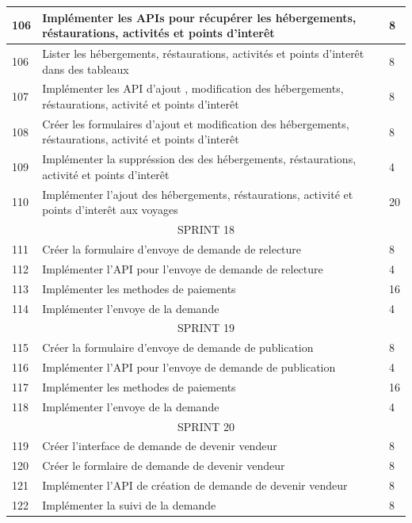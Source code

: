 \documentclass[12pt]{report}
\begin{document}
\begin{longtable}{|p{1cm}|p{7cm}|p{6cm}|}
						\hline
						106 & Implémenter les APIs pour récupérer les hébergements, réstaurations, activités et points d'interêt & 8\\
						\hline
						106 & Lister les hébergements, réstaurations, activités et points d'interêt dans des tableaux & 8\\
						\hline
						107 & Implémenter les API d'ajout , modification des hébergements, réstaurations, activité et points d'interêt & 8\\
						\hline
						108 & Créer les formulaires d'ajout et modification des hébergements, réstaurations, activité et points d'interêt & 8\\
						\hline
						109 & Implémenter la suppréssion des des hébergements, réstaurations, activité et points d'interêt & 4\\
						\hline
						110 & Implémenter l'ajout des hébergements, réstaurations, activité et points d'interêt aux voyages & 20\\
						\hline
						\multicolumn{3}{|c|}{SPRINT 18}\\
						\hline
						111 & Créer la formulaire d'envoye de demande de relecture & 8\\
						112 & Implémenter l'API pour l'envoye de demande de relecture & 4\\
						113 & Implémenter les methodes de paiements & 16\\
						114 & Implémenter l'envoye de la demande & 4\\
						\hline
						\multicolumn{3}{|c|}{SPRINT 19}\\
						\hline
						115 & Créer la formulaire d'envoye de demande de publication & 8\\
						116 & Implémenter l'API pour l'envoye de demande de publication & 4\\
						117 & Implémenter les methodes de paiements & 16\\
						118 & Implémenter l'envoye de la demande & 4\\
						\hline
						\multicolumn{3}{|c|}{SPRINT 20}\\
						\hline
						119 & Créer l'interface de demande de devenir vendeur & 8\\
						\hline
						120 & Créer le formlaire de demande de devenir vendeur & 8\\
						\hline
						121 & Implémenter l'API de création de demande de devenir vendeur & 8\\
						\hline
						122 & Implémenter la suivi de la demande & 8\\
						\hline
				    \end{longtable}
\end{document}
